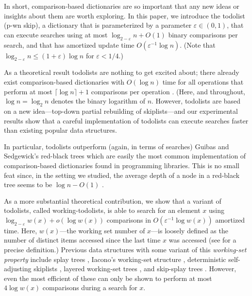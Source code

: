 \documentclass{patmorin}
\newcommand{\eps}{\varepsilon}
\begin{document}
In short, comparison-based dictionaries are so important that any
new ideas or insights about them are worth exploring.  In this paper,
we introduce the todolist (p-wn skip),
a dictionary that is parameterized by a parameter $\eps\in(0,1)$, 
that can execute searches using at most $\log_{2-\eps} n + O(1)$ binary
comparisons per search, and that has amortized update time $O(\eps^{-1}\log
n)$.  (Note that $\log_{2-\eps} n \le (1+\eps)\log n$ for $\eps < 1/4$.)

As a theoretical result todolists are nothing to get excited about; there
already exist comparison-based dictionaries with $O(\log n)$ time for all
operations that perform at most $\lceil\log n\rceil+1$ comparisons per
operation \cite{andersson.lai:fast,fagerberg:binary}. (Here, and throughout,
$\log n=\log_2 n$ denotes the binary logarithm of $n$. However, todolists
are based on a new idea---top-down partial rebuilding of skiplists---and
our experimental results show that a careful implementation of todolists
can execute searches faster than existing popular data structures.

In particular, todolists outperform (again, in terms of searches) Guibas
and Sedgewick's red-black trees \cite{guibas.sedgewick:dichromatic} which are
easily the most common implementation of comparison-based dictionaries
found in programming libraries. This is no small feat since, in the
setting we studied, the average depth of a node in a red-black tree
seems to be $\log n - O(1)$ \cite{sedgewick:left-leaning}.

As a more substantial theoretical contribution, we show that a variant of todolists, called working-todolists, is able to search for
an element $x$ using $\log_{2-\eps} w(x)+o(\log w(x))$ comparisons
in $O(\eps^{-1}\log w(x))$ amortized time.  Here, $w(x)$---the
working set number of $x$---is loosely defined as the number of
distinct items accessed since the last time $x$ was accessed (see
 for a precise definition.)  Previous data
structures with some variant of this \emph{working-set property}
include splay trees \cite{sleator.tarjan:self-adjusting}, Iacono's
working-set structure \cite{iacono:alternatives,badoiu.cole.ea:unified},
deterministic self-adjusting skiplists \cite{bose.douieb.ea:dynamic},
layered working-set trees \cite{bose.douieb.ea:layered}, and skip-splay
trees \cite{derryberry.sleator:skip-splay}.  However, even the most
efficient of these can only be shown to perform at most $4\log w(x)$
comparisons during a search for $x$.
\end{document}
